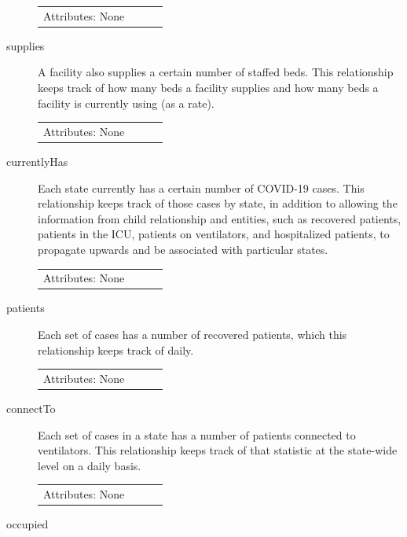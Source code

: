 \documentclass[11pt]{article}
\begin{document}
\begin{description}
\begin{tabular}{lllc}
     Attributes: None \\
\end{tabular}

\item [supplies]

\noindent
A facility also supplies a certain number of staffed beds. This relationship keeps track of how many beds a facility supplies and how many beds a facility is currently using (as a rate).

\begin{tabular}{lllc}
    Attributes: None \\
\end{tabular}

\item [currentlyHas]

\noindent
Each state currently has a certain number of COVID-19 cases. This relationship keeps track of those cases by state, in addition to allowing the information from child relationship and entities, such as recovered patients, patients in the ICU, patients on ventilators, and hospitalized patients, to propagate upwards and be associated with particular states.

\begin{tabular}{lllc}
    Attributes: None \\
\end{tabular}

\item [patients]

\noindent
Each set of cases has a number of recovered patients, which this relationship keeps track of daily.

\begin{tabular}{lllc}
    Attributes: None \\
\end{tabular}

\item [connectTo]

\noindent
Each set of cases in a state has a number of patients connected to ventilators. This relationship keeps track of that statistic at the state-wide level on a daily basis.

\begin{tabular}{lllc}
    Attributes: None \\
\end{tabular}

\item [occupied]


\end{description}
\end{document}
